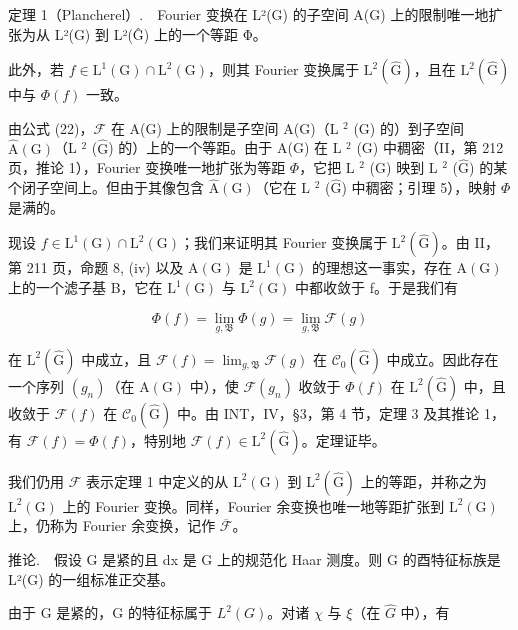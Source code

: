 定理 1（Plancherel）.　Fourier 变换在 L²(G) 的子空间 A(G) 上的限制唯一地扩张为从 L²(G) 到 L²(Ĝ) 上的一个等距 Φ。

此外，若 \(f \in \mathrm{L}^{1}(\mathrm{G}) \cap \mathrm{L}^{2}(\mathrm{G})\)，则其 Fourier 变换属于 \(\mathrm{L}^{2}(\widehat{\mathrm{G}})\)，且在 \(\mathrm{L}^{2}(\widehat{\mathrm{G}})\) 中与 \(\Phi(f)\) 一致。

由公式 (22)，\(\mathcal{F}\) 在 A(G) 上的限制是子空间 A(G)（L \(^2\) (G) 的）到子空间 \(\hat{\mathrm{A}}(\mathrm{G})\)（L \(^2\) (\(\hat{\mathrm{G}}\)) 的）上的一个等距。由于 A(G) 在 L \(^2\) (G) 中稠密（II，第 212 页，推论 1），Fourier 变换唯一地扩张为等距 \(\Phi\)，它把 L \(^2\) (G) 映到 L \(^2\) (\(\hat{\mathrm{G}}\)) 的某个闭子空间上。但由于其像包含 \(\hat{\mathrm{A}}(\mathrm{G})\)（它在 L \(^2\) (\(\hat{\mathrm{G}}\)) 中稠密；引理 5），映射 \(\Phi\) 是满的。

现设 \(f \in \mathrm{L}^{1}(\mathrm{G}) \cap \mathrm{L}^{2}(\mathrm{G})\)；我们来证明其 Fourier 变换属于 \(\mathrm{L}^{2}(\widehat{\mathrm{G}})\)。由 II，第 211 页，命题 8, (iv) 以及 \(\mathrm{A}(\mathrm{G})\) 是 \(\mathrm{L}^{1}(\mathrm{G})\) 的理想这一事实，存在 \(\mathrm{A}(\mathrm{G})\) 上的一个滤子基 B，它在 \(\mathrm{L}^{1}(\mathrm{G})\) 与 \(\mathrm{L}^{2}(\mathrm{G})\) 中都收敛于 f。于是我们有

\[
\Phi (f) = \lim _ {g, \mathfrak {B}} \Phi (g) = \lim _ {g, \mathfrak {B}} \mathcal {F} (g)
\]

在 \(\mathrm{L}^{2}(\widehat{\mathrm{G}})\) 中成立，且 \(\mathcal{F}(f)=\lim_{g,\mathfrak{B}}\mathcal{F}(g)\) 在 \(\mathcal{C}_{0}(\widehat{\mathrm{G}})\) 中成立。因此存在一个序列 \((g_{n})\)（在 \(\mathrm{A}(\mathrm{G})\) 中），使 \(\mathcal{F}(g_{n})\) 收敛于 \(\Phi(f)\) 在 \(\mathrm{L}^{2}(\widehat{\mathrm{G}})\) 中，且收敛于 \(\mathcal{F}(f)\) 在 \(\mathcal{C}_{0}(\widehat{\mathrm{G}})\) 中。由 INT，IV，§3，第 4 节，定理 3 及其推论 1，有 \(\mathcal{F}(f)=\Phi(f)\)，特别地 \(\mathcal{F}(f)\in\mathrm{L}^{2}(\widehat{\mathrm{G}})\)。定理证毕。

我们仍用 \(\mathcal{F}\) 表示定理 1 中定义的从 \(\mathrm{L}^2 (\mathrm{G})\) 到 \(\mathrm{L}^2 (\widehat{\mathrm{G}})\) 上的等距，并称之为 \(\mathrm{L}^2 (\mathrm{G})\) 上的 Fourier 变换。同样，Fourier 余变换也唯一地等距扩张到 \(\mathrm{L}^2 (\mathrm{G})\) 上，仍称为 Fourier 余变换，记作 \(\overline{\mathcal{F}}\)。

推论.　假设 G 是紧的且 dx 是 G 上的规范化 Haar 测度。则 G 的酉特征标族是 L²(G) 的一组标准正交基。

由于 G 是紧的，G 的特征标属于 \(L^{2}(G)\)。对诸 \(\chi\) 与 \(\xi\)（在 \(\widehat{G}\) 中），有

